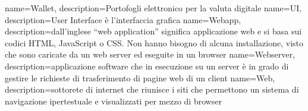  { name={Wallet}, description={Portofogli elettronico per la valuta digitale} }
 { name={UI}, description={User Interface è l'interfaccia grafica} }
 { name={Webapp}, description={dall'inglese “web application” significa applicazione web e si basa sui codici HTML, JavaScript o CSS. Non hanno bisogno di alcuna installazione, visto che sono caricate da un web server ed eseguite in un browser} }
 { name={Webserver}, description={applicazione software che in esecuzione su un server è in grado di gestire le richieste di trasferimento di pagine web di un client} }
 { name={Web}, description={sottorete di internet che riunisce i siti che permettono un sistema di navigazione ipertestuale e visualizzati per mezzo di browser} }

